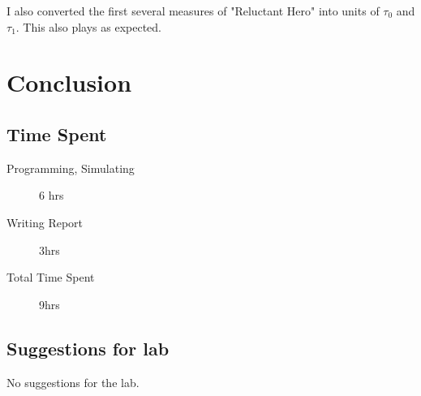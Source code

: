 \documentclass[11pt]{article}
\begin{document}
I also converted the first several measures of "Reluctant Hero" into units of $\tau_{0}$ and $\tau_{1}$. This also plays as expected.


\section{Conclusion}

\subsection{Time Spent}

\begin{description}
	\item[Programming, Simulating] 6 hrs
 	\item[Writing Report] 3hrs
	\item[Total Time Spent] 9hrs
\end{description}

\subsection{Suggestions for lab}

No suggestions for the lab.
\end{document}

